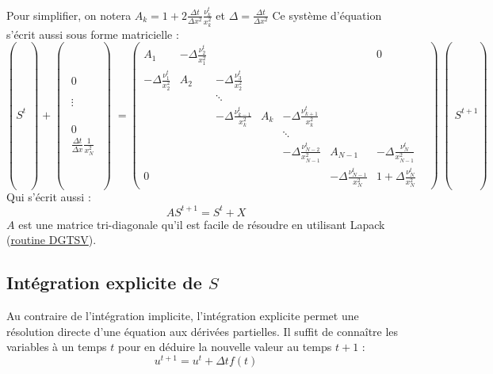 Pour simplifier, on notera $A_k = 1 + 2 \frac{\Delta t}{\Delta x^2}\frac{\nu_k^t}{x_k^2}$ et $\Delta = \frac{\Delta t}{\Delta x^2}$
Ce système d'équation s'écrit aussi sous forme matricielle :
\begin{equation}
  \left(S^t\middle) + 
  \middle(\begin{matrix}
    0 \\
    \\
    \\
    \vdots \\
    \\
    \\
    \\
    0 \\
    \frac{\Delta t}{\Delta x}\frac{1}{x_N^2}
  \end{matrix}\middle)
  =
  \begin{pmatrix}
A_1                            & -\Delta\frac{\nu_{2}^t}{x_1^2} &  & & & & 0\\
-\Delta \frac{\nu_{1}^t}{x_2^2} & A_2                           & -\Delta\frac{\nu_{3}^t}{x_2^2} & & & &\\
    &        & \ddots                          &  & & & &\\
    &        & -\Delta \frac{\nu_{k-1}^t}{x_k^2} & A_k    & -\Delta \frac{\nu_{k+1}^t}{x_k^2} & &\\
    &        &                                 & & \ddots                          & & \\
    & & & & -\Delta \frac{\nu_{N-2}^t}{x_{N-1}^2} & A_{N-1} & -\Delta \frac{\nu_{N}^t}{x_{N-1}^2}\\
    0 & & & & & -\Delta \frac{\nu_{N-1}^t}{x_N^2} & 1 + \Delta \frac{\nu_N^t}{x_N^2}
  \end{pmatrix} \middle(S^{t+1}\right)
\end{equation}
Qui s'écrit aussi :
\begin{equation}
  AS^{t+1} = S^t + X 
\end{equation}
$A$ est une matrice tri-diagonale qu'il est facile de résoudre en utilisant Lapack (\href{http://www.netlib.org/lapack/explore-html/d4/d62/group__double_g_tsolve.html#ga2bf93f2ddefa5e671866eb2191dc19d4}{routine DGTSV}).

\subsection{Intégration explicite de $S$}
\label{ssec:integration_S_exp}
Au contraire de l'intégration implicite, l'intégration explicite permet une résolution directe d'une équation aux dérivées partielles. Il suffit de connaître les variables à un temps $t$ pour en déduire la nouvelle valeur au temps $t+1$ :
\begin{equation}
  u^{t+1} = u^t + \Delta t f(t)
\end{equation}
